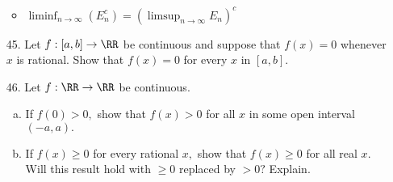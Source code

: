 \documentclass{article}
\begin{document}
\begin{itemize}
\begin{itemize}
			\item $\displaystyle\liminf_{n\to\infty}(E_n^c) = \left( \limsup_{n\to\infty} E_n \right)^c$

		\end{itemize}

	\item[45.] Let $f:[a, b]\to\RR$ be continuous and suppose that $f(x)=0$ whenever $x$ is rational. Show that $f(x)=0$ for every $x$ in $[a, b].$

	\item[46.] Let $f:\RR\to\RR$ be continuous.
		\begin{enumerate}[(a)]
			\item If $f(0)>0,$ show that $f(x)>0$ for all $x$ in some open interval $(-a, a).$

			\item If $f(x)\ge 0$ for every rational $x,$ show that $f(x)\ge0$ for all real $x.$ Will this result hold with $\ge0$ replaced by $>0?$ Explain.
				
		\end{enumerate}
		
\end{itemize}
\end{document}
